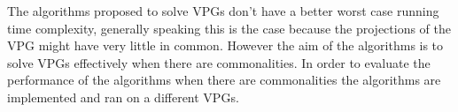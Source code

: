 The algorithms proposed to solve VPGs don't have a better worst case running time complexity, generally speaking this is the case because the projections of the VPG might have very little in common. However the aim of the algorithms is to solve VPGs effectively when there are commonalities. In order to evaluate the performance of the algorithms when there are commonalities the algorithms are implemented and ran on a different VPGs.